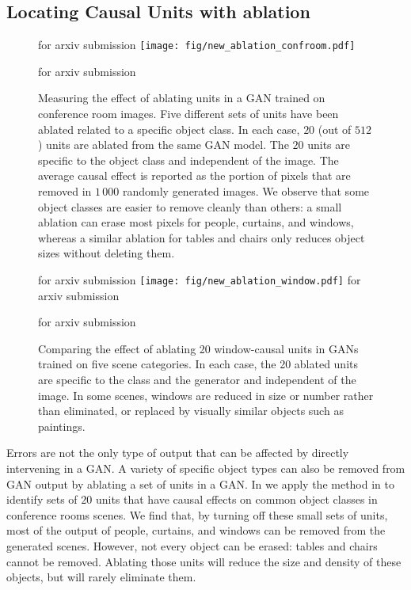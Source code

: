 \documentclass{article} %
\def\arxiv{for arxiv submission}
\begin{document}
\subsection{Locating Causal Units with ablation}\begin{figure}[t]
\ifdefined\arxiv
\else
\vspace{-20pt}
\fi
\centering
\texttt{[image: fig/new\_ablation\_confroom.pdf]}
\vspace{-10pt}
\caption{Measuring the effect of ablating units in a GAN trained on conference room images. Five different sets of units have been ablated related to a specific object class.  In each case, $20$ (out of $512$) units are ablated from the same GAN model. The $20$ units are specific to the object class and independent of the image.  The average causal effect is reported as the portion of pixels that are removed in $1\,000$ randomly generated images.   We observe that some object classes are easier to remove cleanly than others: a small ablation can erase most pixels for people, curtains, and windows, whereas a similar ablation for tables and chairs only reduces object sizes without deleting them.}
\ifdefined\arxiv
\vspace{-15pt}
\else
\fi
\end{figure}\begin{figure}[t]
\ifdefined\arxiv
\vspace{-15pt}
\fi
\centering
\texttt{[image: fig/new\_ablation\_window.pdf]}
\ifdefined\arxiv
\vspace{-10pt}
\else
\vspace{-10pt}
\fi
\caption{Comparing the effect of ablating 20 window-causal units in GANs trained on five scene categories. In each case, the 20 ablated units are specific to the class and the generator and independent of the image.  In some scenes, windows are reduced in size or number rather than eliminated, or replaced by visually similar objects such as paintings.}
\ifdefined\arxiv
\else
\vspace{-10pt}
\fi{}
\end{figure}
Errors are not the only type of output that can be affected by directly intervening in a GAN.  A variety of specific object types can also be removed from GAN output by ablating a set of units in a GAN.  In  we apply the method in  to identify sets of $20$ units that have causal effects on common object classes in conference rooms scenes.  We find that, by turning off these small sets of units, most of the output of people, curtains, and windows can be removed from the generated scenes.  However, not every object can be erased: tables and chairs cannot be removed.  Ablating those units will reduce the size and density of these objects, but will rarely eliminate them.
\end{document}
